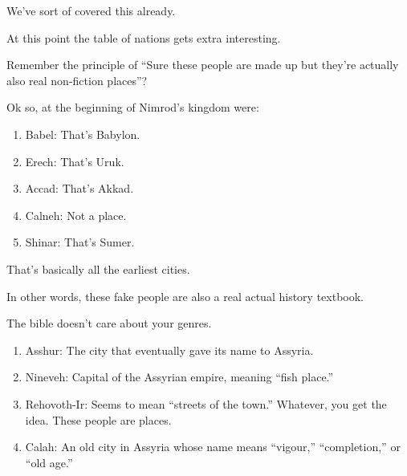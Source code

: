 {
}
{
}
{
	We've sort of covered this already.
}

{
}
{
}
{
	At this point the table of nations gets extra interesting.

	Remember the principle of ``Sure these people are made up but they're
	actually also real non-fiction places''?

	Ok so, at the beginning of Nimrod's kingdom were:
	
	\begin{enumerate}
	\item Babel: That's Babylon.
	\item Erech: That's Uruk.
	\item Accad: That's Akkad.
	\item Calneh: Not a place.
	\item Shinar: That's Sumer.
	\end{enumerate}

	That's basically all the earliest cities.

	In other words, these fake people are also a real actual history textbook.
	
	The bible doesn't care about your genres.
}

{
}
{
}
{
	\begin{enumerate}
	\item Asshur: The city that eventually gave its name to Assyria.
	\item Nineveh: Capital of the Assyrian empire, meaning ``fish place.''
	\item Rehovoth-Ir: Seems to mean ``streets of the town.''
		  Whatever, you get the idea. These people are places.
	\item Calah: An old city in Assyria whose name means ``vigour,''
		  ``completion,'' or ``old age.''
	\end{enumerate}

}

